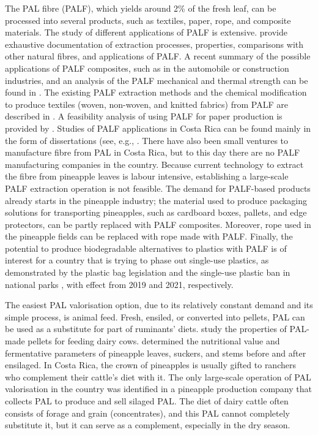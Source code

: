 The PAL fibre (PALF), which yields around 2\% of the fresh leaf, can be processed into several products, such as textiles, paper, rope, and composite materials. The study of different applications of PALF is extensive. \cite{rafiqah2020effect} provide exhaustive documentation of extraction processes, properties, comparisons with other natural fibres, and applications of PALF. A recent summary of the possible applications of PALF composites, such as in the automobile or construction industries, and an analysis of the PALF mechanical and thermal strength can be found in \cite{jain2022pineapple}. The existing PALF extraction methods and the chemical modification to produce textiles (woven, non-woven, and knitted fabrics) from PALF are described in \cite{jose2016overview}. A feasibility analysis of using PALF for paper production is provided by \cite{sibaly2017production}. Studies of PALF applications in Costa Rica can be found mainly in the form of dissertations (see, e.g., \cite{tecDissertation, cuerdaUCR, NanofibriUNA}. There have also been small ventures to manufacture fibre from PAL in Costa Rica, but to this day there are no PALF manufacturing companies in the country. Because current technology to extract the fibre from pineapple leaves is labour intensive, establishing a large-scale PALF extraction operation is not feasible. The demand for PALF-based products already starts in the pineapple industry; the material used to produce packaging solutions for transporting pineapples, such as cardboard boxes, pallets, and edge protectors, can be partly replaced with PALF composites. Moreover, rope used in the pineapple fields can be replaced with rope made with PALF. Finally, the potential to produce biodegradable alternatives to plastics with PALF is of interest for a country that is trying to phase out single-use plastics, as demonstrated by the 	
plastic bag legislation \cite{LeyN9786} and the single-use plastic ban in national parks \cite{sinacPlastic}, with effect from 2019 and 2021, respectively. 

The easiest PAL valorisation option, due to its relatively constant demand and its simple process, is animal feed. Fresh, ensiled, or converted into pellets, PAL can be used as a substitute for part of ruminants' diets. \cite{buliah2019production} study the properties of PAL-made pellets for feeding dairy cows. \cite{lopez2009caracteristicas} determined the nutritional value and fermentative parameters of pineapple leaves, suckers, and stems before and after ensilaged. In Costa Rica, the crown of pineapples is usually gifted to ranchers who complement their cattle's diet with it. The only large-scale operation of PAL valorisation in the country was identified in a pineapple production company that collects PAL to produce and sell silaged PAL. The diet of dairy cattle often consists of forage and grain (concentrates), and this PAL cannot completely substitute it, but it can serve as a complement, especially in the dry season. 

